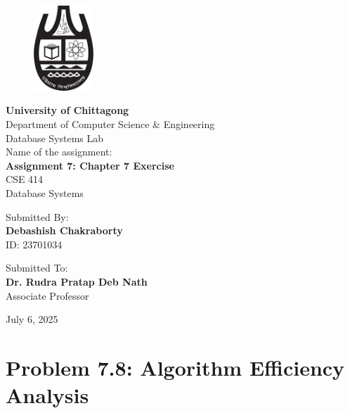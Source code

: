 \documentclass[12pt,a4paper]{article}
\begin{document}
\begin{titlepage}
    \begin{figure}[htbp]
    \centering
    \includegraphics[width=0.2\textwidth]{cu.png}
    \end{figure}
    \centering
    \vspace*{0.5cm}
    {\Huge\bfseries University of Chittagong}\\[0.5cm]
    {\Large Department of Computer Science \& Engineering}\\[0.5cm]
    {\large Database Systems Lab}\\[2cm]
    
    {\large Name of the assignment:}\\[0.3cm]
    {\LARGE\bfseries Assignment 7: Chapter 7 Exercise\\[0.5cm]}
    {\large CSE 414}\\[0.5cm]
    {\large Database Systems}\\[3.5cm]
    
    \begin{minipage}[t]{0.4\textwidth}
    \raggedleft
    Submitted By:\\
    \large \textbf{Debashish Chakraborty}\\
    \large ID: 23701034
    \end{minipage}
    \hspace{0.05\textwidth}
    \vrule width 1pt
    \hspace{0.05\textwidth}
    \begin{minipage}[t]{0.4\textwidth}
    Submitted To:\\
    \large \textbf{Dr. Rudra Pratap Deb Nath}\\
    \large Associate Professor
    \end{minipage}
    
    \vfill
    {\large July 6, 2025}
\end{titlepage}

\newpage
\tableofcontents
\newpage 

\section{Problem 7.8: Algorithm Efficiency Analysis}
\end{document}
